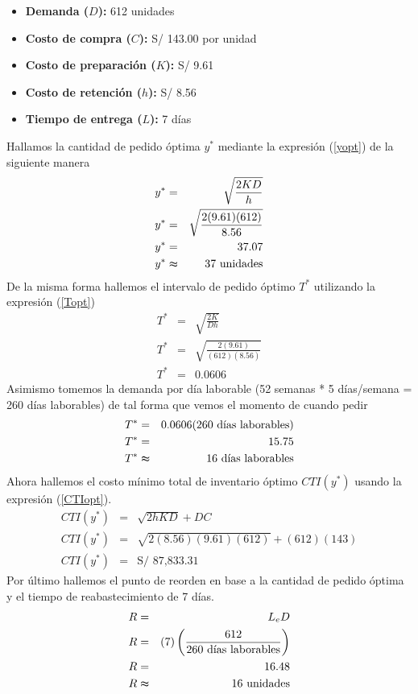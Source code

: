 \begin{itemize}
    \item \textbf{Demanda ($D$):} 612 unidades
    \item \textbf{Costo de compra ($C$):} S/ 143.00 por unidad
    \item \textbf{Costo de preparación ($K$):} S/ 9.61
    \item \textbf{Costo de retención ($h$):} S/ 8.56
    \item \textbf{Tiempo de entrega ($L$):} 7 días
\end{itemize}

Hallamos la cantidad de pedido óptima $y^*$ mediante la expresión (\ref{yopt}) de la siguiente manera
\begin{eqnarray}
    y^* &=& \sqrt{\frac{2KD}{h}} \nonumber \\
    y^* &=& \sqrt{\frac{2(9.61)(612)}{8.56}} \nonumber \\
    y^* &=& 37.07 \nonumber \\
    y^* &\thickapprox& 37 \text{ unidades} \nonumber
\end{eqnarray}
De la misma forma hallemos el intervalo de pedido óptimo $T^*$ utilizando la expresión (\ref{Topt}) 
\begin{eqnarray}
    T^* &=& \sqrt{\frac{2K}{Dh}} \nonumber \\
    T^* &=& \sqrt{\frac{2(9.61)}{(612)(8.56)}} \nonumber \\
    T^* &=& 0.0606 \nonumber
\end{eqnarray}
Asimismo tomemos la demanda por día laborable (52 semanas * 5 días/semana = 260 días laborables) de tal forma que vemos el momento de cuando pedir
\begin{eqnarray}
    T^* &=& 0.0606 (260 \text{ días laborables}) \nonumber \\   
    T^* &=& 15.75 \nonumber \\
    T^* &\thickapprox& 16 \text{ días laborables} \nonumber
\end{eqnarray}
Ahora hallemos el costo mínimo total de inventario óptimo $CTI(y^*)$ usando la expresión (\ref{CTIopt}).
\begin{eqnarray}
    CTI(y^*) &=& \sqrt{2hKD} + DC \nonumber \\
    CTI(y^*) &=& \sqrt{2(8.56)(9.61)(612)} + (612)(143) \nonumber \\
    CTI(y^*) &=& \text{S/ 87,833.31} \nonumber
\end{eqnarray}
Por último hallemos el punto de reorden en base a la cantidad de pedido óptima y el tiempo de reabastecimiento de 7 días.
\begin{eqnarray}
    R &=& L_e D \nonumber \\
    R &=& (7) \left(\frac{612}{260 \text{ días laborables}} \right) \nonumber \\
    R &=& 16.48 \nonumber \\
    R &\thickapprox& 16 \text{ unidades} \nonumber
\end{eqnarray}

